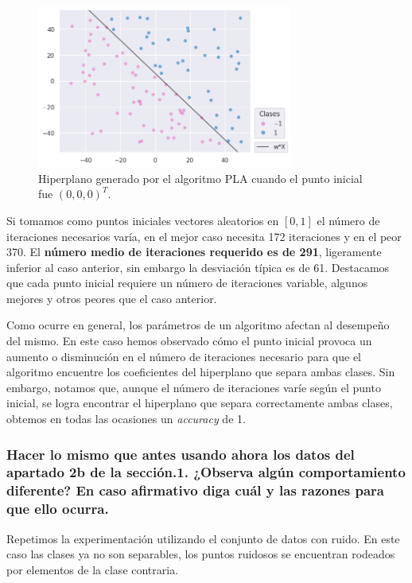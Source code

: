 \documentclass[a4paper, 20pt]{article}
\begin{document}
\begin{figure}[H]
    \centering
    \includegraphics[width=0.75\textwidth]{21}
    \caption{Hiperplano generado por el algoritmo PLA cuando el punto inicial fue $(0,0,0)^T$.}
    \label{fig:21}
\end{figure}

Si tomamos como puntos iniciales vectores aleatorios en $[0,1]$ el número de iteraciones necesarios varía, en el mejor caso necesita 172 iteraciones y en el peor 370. El \textbf{número medio de iteraciones requerido es de 291}, ligeramente inferior al caso anterior, sin embargo la desviación típica es de 61. Destacamos que cada punto inicial requiere un número de iteraciones variable, algunos mejores y otros peores que el caso anterior.

Como ocurre en general, los parámetros de un algoritmo afectan al desempeño del mismo. En este caso hemos observado cómo el punto inicial provoca un aumento o disminución en el número de iteraciones necesario para que el algoritmo encuentre los coeficientes del hiperplano que separa ambas clases. Sin embargo, notamos que, aunque el número de iteraciones varíe según el punto inicial, se logra encontrar el hiperplano que separa correctamente ambas clases, obtemos en todas las ocasiones un \textit{accuracy} de 1.

\subsubsection{Hacer lo mismo que antes usando ahora los datos del apartado 2b de la sección.1. ¿Observa algún comportamiento diferente? En caso afirmativo diga cuál y las razones para que ello ocurra.}

Repetimos la experimentación utilizando el conjunto de datos con ruido. En este caso las clases ya no son separables, los puntos ruidosos se encuentran rodeados por elementos de la clase contraria.
\end{document}
